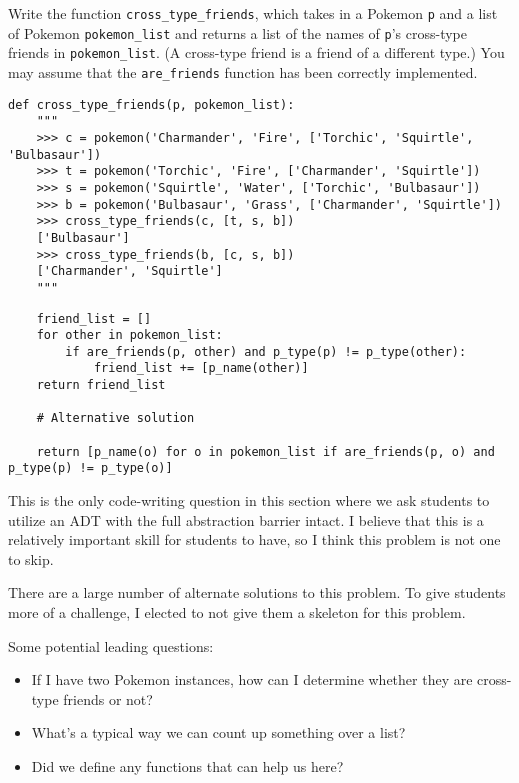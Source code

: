     \begin{blocksection}
    \question Write the function \lstinline{cross_type_friends}, which takes in a Pokemon \lstinline{p} and
    a list of Pokemon \lstinline{pokemon_list} and returns a list of the names of \lstinline{p}'s cross-type
    friends in \lstinline{pokemon_list}. (A cross-type friend is a friend of a different type.)
    You may assume that the \lstinline{are_friends} function has been correctly implemented. 
    \begin{lstlisting}
def cross_type_friends(p, pokemon_list): 
    """
    >>> c = pokemon('Charmander', 'Fire', ['Torchic', 'Squirtle', 'Bulbasaur'])
    >>> t = pokemon('Torchic', 'Fire', ['Charmander', 'Squirtle'])
    >>> s = pokemon('Squirtle', 'Water', ['Torchic', 'Bulbasaur'])
    >>> b = pokemon('Bulbasaur', 'Grass', ['Charmander', 'Squirtle'])
    >>> cross_type_friends(c, [t, s, b])
    ['Bulbasaur']
    >>> cross_type_friends(b, [c, s, b])
    ['Charmander', 'Squirtle']
    """
    \end{lstlisting}

    \begin{solution}[2in]
    \begin{lstlisting}
    friend_list = []
    for other in pokemon_list:
        if are_friends(p, other) and p_type(p) != p_type(other):
            friend_list += [p_name(other)]
    return friend_list

    # Alternative solution

    return [p_name(o) for o in pokemon_list if are_friends(p, o) and p_type(p) != p_type(o)]
    \end{lstlisting}
    \end{solution}

    \end{blocksection}
    \begin{questionmeta}
    This is the only code-writing question in this section where we ask students to utilize an ADT with the full abstraction barrier intact. 
    I believe that this is a relatively important skill for students to have, so I think this problem is not one to skip. 

    There are a large number of alternate solutions to this problem. To give students more of a challenge, I elected to not give them a 
    skeleton for this problem. 

    Some potential leading questions: 
    \begin{itemize}
        \item If I have two Pokemon instances, how can I determine whether they are cross-type friends or not? 
        \item What's a typical way we can count up something over a list? 
        \item Did we define any functions that can help us here? 
    \end{itemize}

    \end{questionmeta}
